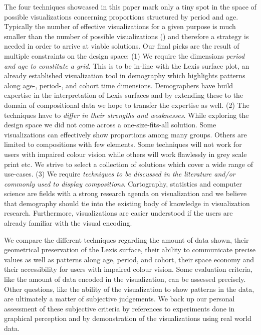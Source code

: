 \documentclass[parskip=half]{scrartcl}
\begin{document}
The four techniques showcased in this paper mark only a tiny spot in the space of possible visualizations concerning proportions structured by period and age. Typically the number of effective visualizations for a given purpose is much smaller than the number of possible visualizations (\cite{Munzner2015}) and therefore a strategy is needed in order to arrive at viable solutions. Our final picks are the result of multiple constraints on the design space:
  (1) We require the dimensions \emph{period and age to constitute a grid}. This is to be in-line with the Lexis surface plot, an already established visualization tool in demography which highlights patterns along age-, period-, and cohort time dimensions. Demographers have build expertise in the interpretation of Lexis surfaces and by extending these to the domain of compositional data we hope to transfer the expertise as well.
  (2) The techniques have to \emph{differ in their strengths and weaknesses}. While exploring the design space we did not come across a one-size-fits-all solution. Some visualizations can effectively show proportions among many groups. Others are limited to compositions with few elements. Some techniques will not work for users with impaired colour vision while others will work flawlessly in grey scale print etc. We strive to select a collection of solutions which cover a wide range of use-cases.
  (3) We require \emph{techniques to be discussed in the literature and/or commonly used to display compositions}. Cartography, statistics and computer science are fields with a strong research agenda on visualization and we believe that demography should tie into the existing body of knowledge in visualization research. Furthermore, visualizations are easier understood if the users are already familiar with the visual encoding.

We compare the different techniques regarding the amount of data shown, their geometrical preservation of the Lexis surface, their ability to communicate precise values as well as patterns along age, period, and cohort, their space economy and their accessibility for users with impaired colour vision. Some evaluation criteria, like the amount of data encoded in the visualization, can be assessed precisely. Other questions, like the ability of the visualization to show patterns in the data, are ultimately a matter of subjective judgements. We back up our personal assessment of these subjective criteria by references to experiments done in graphical perception and by demonstration of the visualizations using real world data.
\end{document}
